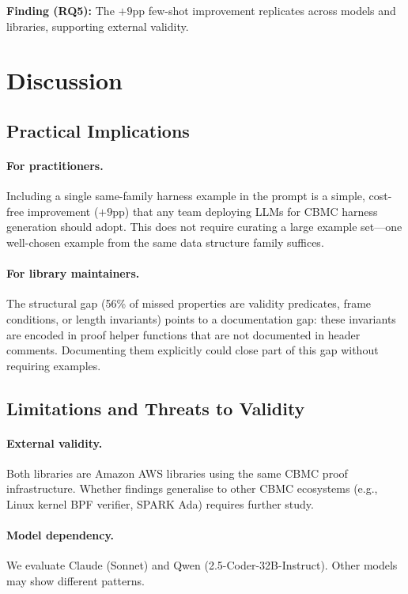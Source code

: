 \documentclass[review]{elsarticle}
\begin{document}
\noindent\textbf{Finding (RQ5):} The $+9$pp few-shot improvement replicates
across models and libraries, supporting external validity.

\section{Discussion}
\label{sec:discussion}

\subsection{Practical Implications}

\paragraph{For practitioners.} Including a single same-family harness example in
the prompt is a simple, cost-free improvement ($+9$pp) that any team deploying
LLMs for CBMC harness generation should adopt. This does not require curating
a large example set---one well-chosen example from the same data structure family
suffices.

\paragraph{For library maintainers.} The structural gap (56\% of missed properties
are validity predicates, frame conditions, or length invariants) points to a
documentation gap: these invariants are encoded in proof helper functions that
are not documented in header comments. Documenting them explicitly could close
part of this gap without requiring examples.

\subsection{Limitations and Threats to Validity}

\paragraph{External validity.} Both libraries are Amazon AWS libraries using the
same CBMC proof infrastructure. Whether findings generalise to other CBMC ecosystems
(e.g., Linux kernel BPF verifier, SPARK Ada) requires further study.

\paragraph{Model dependency.} We evaluate Claude (Sonnet) and Qwen
(2.5-Coder-32B-Instruct). Other models may show different patterns.
\end{document}
